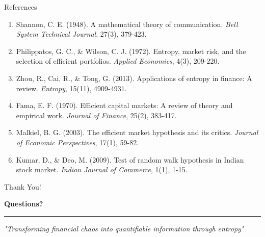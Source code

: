 \documentclass[aspectratio=169,12pt,xcolor=table]{beamer}
\begin{document}
\begin{frame}{References}
\small
\begin{enumerate}
    \item Shannon, C. E. (1948). A mathematical theory of communication. \textit{Bell System Technical Journal}, 27(3), 379-423.
    
    \item Philippatos, G. C., \& Wilson, C. J. (1972). Entropy, market risk, and the selection of efficient portfolios. \textit{Applied Economics}, 4(3), 209-220.
    
    \item Zhou, R., Cai, R., \& Tong, G. (2013). Applications of entropy in finance: A review. \textit{Entropy}, 15(11), 4909-4931.
    
    \item Fama, E. F. (1970). Efficient capital markets: A review of theory and empirical work. \textit{Journal of Finance}, 25(2), 383-417.
    
    \item Malkiel, B. G. (2003). The efficient market hypothesis and its critics. \textit{Journal of Economic Perspectives}, 17(1), 59-82.
    
    \item Kumar, D., \& Deo, M. (2009). Test of random walk hypothesis in Indian stock market. \textit{Indian Journal of Commerce}, 1(1), 1-15.
\end{enumerate}
\end{frame}

\begin{frame}{Thank You!}
\begin{center}
{\Huge \textcolor{niftyblue}{\textbf{Questions?}}}

\vspace{1cm}

\vspace{0.2cm}
\textcolor{niftyorange}{\rule{0.6\textwidth}{2pt}}

\vspace{0.2cm}
\textit{\small "Transforming financial chaos into quantifiable information through entropy"}
\end{center}
\end{frame}
\end{document}
